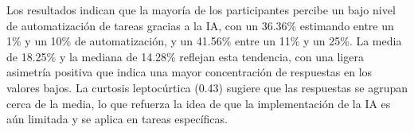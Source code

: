 
Los resultados indican que la mayoría de los participantes percibe un bajo nivel de automatización de tareas gracias a la IA, con un 36.36\% estimando entre un 1\% y un 10\% de automatización, y un 41.56\% entre un 11\% y un 25\%. La media de 18.25\% y la mediana de 14.28\% reflejan esta tendencia, con una ligera asimetría positiva que indica una mayor concentración de respuestas en los valores bajos. La curtosis leptocúrtica (0.43) sugiere que las respuestas se agrupan cerca de la media, lo que refuerza la idea de que la implementación de la IA es aún limitada y se aplica en tareas específicas.
